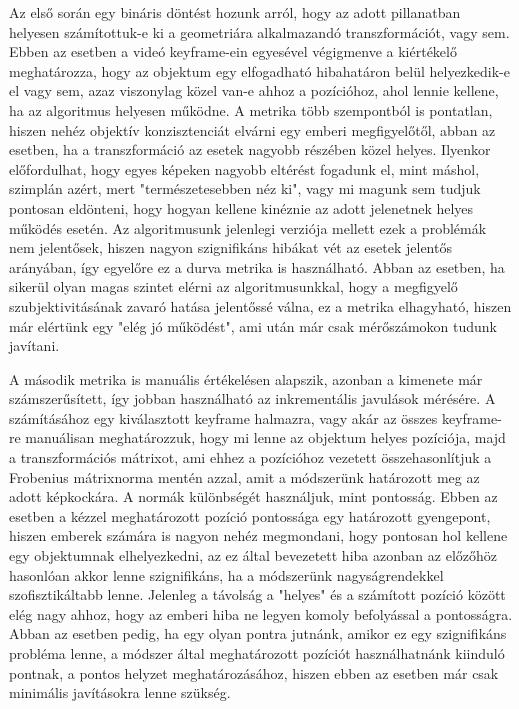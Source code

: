 Az első során egy bináris döntést hozunk arról, hogy az adott pillanatban helyesen számítottuk-e ki a geometriára alkalmazandó transzformációt, vagy sem.
Ebben az esetben a videó keyframe-ein egyesével végigmenve a kiértékelő meghatározza, hogy az objektum egy elfogadható hibahatáron belül helyezkedik-e el vagy sem, azaz viszonylag közel van-e ahhoz a pozícióhoz, ahol lennie kellene, ha az algoritmus helyesen működne.
A metrika több szempontból is pontatlan, hiszen nehéz objektív konzisztenciát elvárni egy emberi megfigyelőtől, abban az esetben, ha a transzformáció az esetek nagyobb részében közel helyes.
Ilyenkor előfordulhat, hogy egyes képeken nagyobb eltérést fogadunk el, mint máshol, szimplán azért, mert "természetesebben néz ki", vagy mi magunk sem tudjuk pontosan eldönteni, hogy hogyan kellene kinéznie az adott jelenetnek helyes működés esetén.
Az algoritmusunk jelenlegi verziója mellett ezek a problémák nem jelentősek, hiszen nagyon szignifikáns hibákat vét az esetek jelentős arányában, így egyelőre ez a durva metrika is használható.
Abban az esetben, ha sikerül olyan magas szintet elérni az algoritmusunkkal, hogy a megfigyelő szubjektivitásának zavaró hatása jelentőssé válna, ez a metrika elhagyható, hiszen már elértünk egy "elég jó működést", ami után már csak mérőszámokon tudunk javítani.

A második metrika is manuális értékelésen alapszik, azonban a kimenete már számszerűsített, így jobban használható az inkrementális javulások mérésére.
A számításához egy kiválasztott keyframe halmazra, vagy akár az összes keyframe-re manuálisan meghatározzuk, hogy mi lenne az objektum helyes pozíciója, majd a transzformációs mátrixot, ami ehhez a pozícióhoz vezetett összehasonlítjuk a Frobenius mátrixnorma mentén azzal, amit a módszerünk határozott meg az adott képkockára.
A normák különbségét használjuk, mint pontosság.
Ebben az esetben a kézzel meghatározott pozíció pontossága egy határozott gyengepont, hiszen emberek számára is nagyon nehéz megmondani, hogy pontosan hol kellene egy objektumnak elhelyezkedni, az ez által bevezetett hiba azonban az előzőhöz hasonlóan akkor lenne szignifikáns, ha a módszerünk nagyságrendekkel szofisztikáltabb lenne.
Jelenleg a távolság a "helyes" és a számított pozíció között elég nagy ahhoz, hogy az emberi hiba ne legyen komoly befolyással a pontosságra.
Abban az esetben pedig, ha egy olyan pontra jutnánk, amikor ez egy szignifikáns probléma lenne, a módszer által meghatározott pozíciót használhatnánk kiinduló pontnak, a pontos helyzet meghatározásához, hiszen ebben az esetben már csak minimális javításokra lenne szükség.

